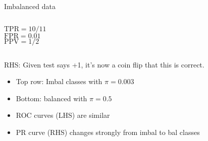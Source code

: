 \documentclass[11pt,compress,t,notes=noshow, xcolor=table]{beamer}
\begin{document}
\begin{vbframe}{Imbalanced data}
\begin{columns}
\begin{column}{0.45\textwidth}
 \medskip
 $\text{TPR} = 10/11$\\
 $\text{FPR} = 0.01$\\
 $\text{PPV} = 1/2$
\end{column}
\end{columns}

\vfill

RHS: Given test says +1, it's now a coin flip that this is correct.




\framebreak


\vspace{-0.2cm}
\begin{itemize}
  \item Top row: Imbal classes with $\pi = 0.003$
  \item Bottom: balanced with $\pi = 0.5$
  \item ROC curves (LHS) are similar
  \item PR curve (RHS) changes strongly from imbal to bal classes
\end{itemize}




\end{vbframe}
\end{document}
